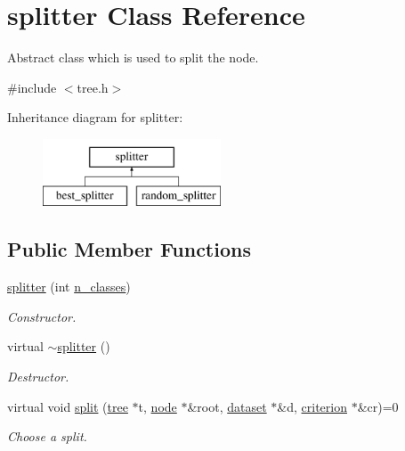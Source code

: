 \hypertarget{classsplitter}{\section{splitter Class Reference}
\label{classsplitter}
}


Abstract class which is used to split the node.  




{\ttfamily \#include $<$tree.\+h$>$}

Inheritance diagram for splitter\+:\begin{figure}[H]
\begin{center}
\leavevmode
\includegraphics[height=2.000000cm]{classsplitter}
\end{center}
\end{figure}
\subsection*{Public Member Functions}
\begin{DoxyCompactItemize}
\item 
\hyperlink{classsplitter_aecf4cc04f2ae39a4a8e13d4049d442cf}{splitter} (int \hyperlink{classsplitter_abfc53538ed65c0afd50aedbf46dff458}{n\+\_\+classes})
\begin{DoxyCompactList}\small\item\em Constructor. \end{DoxyCompactList}\item 
virtual \hyperlink{classsplitter_a221bcb6b6705bb240ef6eea0c95f841a}{$\sim$splitter} ()
\begin{DoxyCompactList}\small\item\em Destructor. \end{DoxyCompactList}\item 
virtual void \hyperlink{classsplitter_af592533ea2d8d16337fa6c8a9a0a6b36}{split} (\hyperlink{classtree}{tree} $\ast$t, \hyperlink{classnode}{node} $\ast$\&root, \hyperlink{classdataset}{dataset} $\ast$\&d, \hyperlink{classcriterion}{criterion} $\ast$\&cr)=0
\begin{DoxyCompactList}\small\item\em Choose a split. \end{DoxyCompactList}\end{DoxyCompactItemize}
